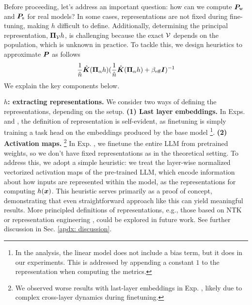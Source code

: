 Before proceeding, let's address an important question: how can we compute ${\bm{P}}_{\text{w}}$ and ${\bm{P}}_{\text{s}}$ for real models? {In some cases, representations are not fixed during fine-tuning, making $h$ difficult to define. Additionally, determining the principal representation, ${\bm{\Pi}}_{{\mathcal{V}}}h$, is challenging because the exact ${\mathcal{V}}$ depends on the population, which is unknown in practice.}
To tackle this, we design heuristics to approximate ${\bm{P}}$ as follows
\begin{align}
\vspace{-0cm}
\label{eq: p_approx}
    \frac{1}{\hat{n}}\hat{\mK}( \mPi_{\alpha} h  ) ( \frac{1}{\hat{n}}\hat{\mK}( \mPi_{\alpha} h  ) + \beta_{\text{eff}}\mI )^{-1}
    \vspace{-0cm}
\end{align}
We explain the key components below.

\textbf{$h$: extracting representations.} We consider two ways of defining the representations, depending on the setup. \textbf{(1) Last layer embeddings.} In Exps.  and , the definition of representation is self-evident, as finetuning is simply training a task head on the embeddings produced by the base model \footnote{In the analysis, the linear model does not include a bias term, but it does in our experiments. This is addressed by appending a constant $1$ to the representation when computing the metrics.}.  \textbf{(2) Activation maps.} \footnote{We observed worse results with last-layer embeddings in Exp. , likely due to complex cross-layer dynamics during finetuning.} In Exp. , we finetune the entire LLM from pretrained weights, {so we don't have fixed representations as in the theoretical setting.} 
To address this, we adopt a simple heuristic:  we treat the layer-wise normalized vectorized activation maps of the pre-trained LLM, which encode information about how inputs are represented within the model, as the representations for computing $h({\bm{x}})$. This heuristic serves primarily as a proof of concept, demonstrating that even straightforward approach like this can yield meaningful results. More principled definitions of representations, e.g., those based on NTK \cite{malladi2023kernel} or representation engineering \cite{zou2023representation}, could be explored in future work. See further discussion in Sec. \ref{apdx: discussion}.
 

